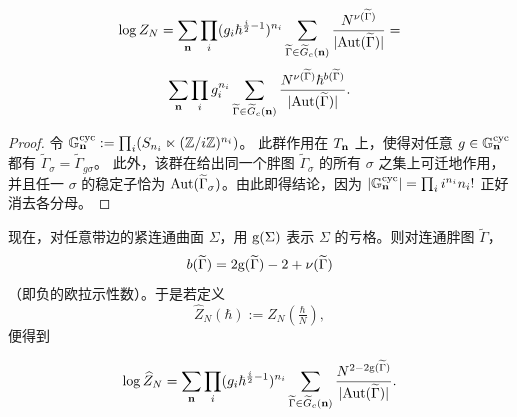 \begin{corollary}\label{fatt1}
$$
\log Z_N=\sum_{\bold n}\prod_i (g_i\hbar^{\frac{i}{2}-1})^{n_i}
\sum_{\widetilde\Gamma\in \widetilde G_c(\bold n)}\frac{N^{\nu(\widetilde\Gamma)}}
{|{\rm Aut}(\widetilde\Gamma)|}=
$$
$$
\sum_{\bold n}\prod_i g_i^{n_i}
\sum_{\widetilde\Gamma\in \widetilde G_c(\bold n)}\frac{N^{\nu(\widetilde\Gamma)}\hbar^{b(\widetilde\Gamma)}}
{|{\rm Aut}(\widetilde\Gamma)|}.
$$
\end{corollary}

\begin{proof} 
令 $\Bbb G_{\bold n}^{\rm cyc}:=
\prod_i (S_{n_i}\ltimes (\Bbb Z/i\Bbb Z)^{n_i})$。
此群作用在 $T_{\bold n}$ 上，使得对任意 $g\in \Bbb G_{\bold n}^{\rm cyc}$ 都有
$\widetilde\Gamma_{\sigma}=\widetilde\Gamma_{g\sigma}$。
此外，该群在给出同一个胖图 $\widetilde\Gamma_{\sigma}$ 的所有 $\sigma$ 之集上可迁地作用，并且任一 $\sigma$ 的稳定子恰为
${\rm Aut}(\widetilde\Gamma_{\sigma})$。由此即得结论，因为 $|\Bbb G_{\bold n}^{\rm cyc}|=\prod_i i^{n_i}n_i!$ 
正好消去各分母。
\end{proof}

现在，对任意带边的紧连通曲面 $\Sigma$，用 ${\rm g}(\Sigma)$ 表示 $\Sigma$ 的亏格。则对连通胖图
$\widetilde\Gamma$，
$$
b(\widetilde\Gamma)=
2{\rm g}(\widetilde\Gamma)-2+\nu(\widetilde\Gamma)
$$ 
（即负的欧拉示性数）。于是若定义
$$
\widehat Z_N(\hbar):=Z_N(\tfrac{\hbar}{N}),
$$
便得到

\begin{theorem}\label{lnZ}
$$
\log\widehat Z_N=
\sum_{\bold n}\prod_i (g_i\hbar^{\frac{i}{2}-1})^{n_i}
\sum_{\widetilde\Gamma\in \widetilde G_c(\bold n)}
\frac{N^{2-2{\rm g}(\widetilde\Gamma)}
}{|{\rm Aut}(\widetilde\Gamma)|}.
$$
\end{theorem}

